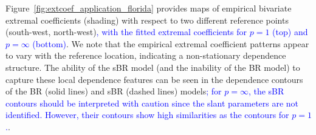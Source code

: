 \documentclass[12pt]{article}
\newcommand{\PZ}{\textcolor{blue}}
\begin{document}
%
Figure~\ref{fig:extcoef_application_florida} provides maps of empirical bivariate extremal coefficients (shading) with respect to two different reference points (south-west, north-west)\PZ{, with the fitted extremal coefficients for $p=1$ (top) and $p=\infty$ (bottom)}. We note that the empirical extremal coefficient patterns appear to vary with the reference location, indicating a non-stationary dependence structure. The ability of the sBR model (and the inability of the BR model) to capture these local dependence features can be seen in the dependence contours of the BR (solid lines) and sBR (dashed lines) models\PZ{; for $p=\infty$, the sBR contours should be interpreted with caution since the slant parameters are not identified. However, their contours show high similarities as the contours for $p=1$.}. 
%
%
\end{document}
